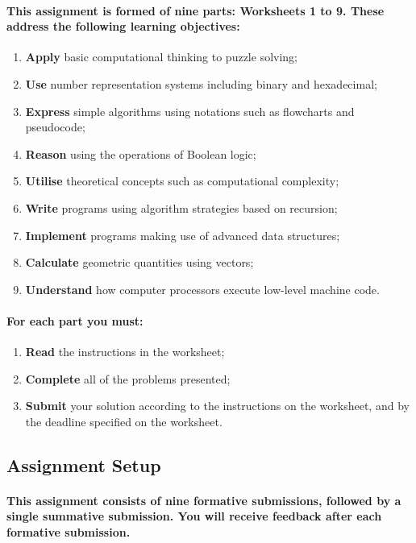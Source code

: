 \documentclass{../../fal_assignment}
\begin{document}
\paragraph{This assignment is formed of \textbf{nine} parts: Worksheets 1 to 9.
These address the following learning objectives:}
\begin{enumerate}
	\item \textbf{Apply} basic computational thinking to puzzle solving;
	\item \textbf{Use} number representation systems including binary and hexadecimal;
	\item \textbf{Express} simple algorithms using notations such as flowcharts and pseudocode;
	\item \textbf{Reason} using the operations of Boolean logic;
	\item \textbf{Utilise} theoretical concepts such as computational complexity;
	\item \textbf{Write} programs using algorithm strategies based on recursion;
	\item \textbf{Implement} programs making use of advanced data structures;
	\item \textbf{Calculate} geometric quantities using vectors;
	\item \textbf{Understand} how computer processors execute low-level machine code.
\end{enumerate}

\paragraph{For each part you must:}
\begin{enumerate}[label=(\roman*)]
    \item \textbf{Read} the instructions in the worksheet;
    \item \textbf{Complete} all of the problems presented;
    \item \textbf{Submit} your solution according to the instructions on the worksheet, and by the deadline specified on the worksheet.
\end{enumerate}

\subsection*{Assignment Setup} 

\paragraph{This assignment consists of \textbf{nine formative submissions}, followed by a \textbf{single summative submission}.
You will receive \textbf{feedback} after each formative submission.}
\end{document}
